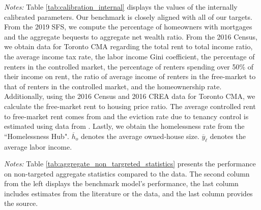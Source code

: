 \documentclass[parskip=full]{article}
\newenvironment{fignote2}[1]
{
\par
\medskip
\begin{minipage}{#1}
\footnotesize
}
{
\end{minipage}
}
\begin{document}
\begin{table}[H]
    \centering
    \caption{Internally assigned parameter values}
    \vspace{-0.5cm}
    \label{tab:calibration_internal}
    
    \vspace{-0.45cm}
    \begin{fignote2}{0.98\textwidth}
    \textit{Notes:} Table \ref{tab:calibration_internal} displays the values of the internally calibrated parameters. Our benchmark is closely aligned with all of our targets. From the 2019 SFS, we compute the percentage of homeowners with mortgages and the aggregate bequests to aggregate net wealth ratio.  From the 2016 Census, we obtain data for Toronto CMA regarding the total rent to total income ratio, the average income tax rate, the labor income Gini coefficient, the percentage of renters in the controlled market, the percentage of renters spending over 50\% of their income on rent, the ratio of average income of renters in the free-market to that of renters in the controlled market, and the homeownership rate. Additionally, using the 2016 Census and 2016 CREA data for Toronto CMA, we calculate the free-market rent to housing price ratio. The average controlled rent to free-market rent comes from \citet{zhang-gou} and the eviction rate due to tenancy control is estimated using data from \citet{LeonIveniuk2020}. Lastly, we obtain the homelessness rate from the ``Homelessness Hub". $\overline{h}_{o}$ denotes the average owned-house size. $\overline{y}_{\ell}$ denotes the average labor income. %
    \end{fignote2}
\end{table}

\begin{table}[H]
    \centering
    \caption{Aggregate non-targeted statistics}
    \vspace{-0.5cm}
    \label{tab:aggregate_non_targreted_statistics}  
    \vspace{-0.45cm}
    \begin{fignote2}{0.74\textwidth}
      \textit{Notes:} Table \ref{tab:aggregate_non_targreted_statistics} presents the performance on non-targeted aggregate statistics compared to the data. The second column from the left displays the benchmark model's performance, the last column includes estimates from the literature or the data, and the last column provides the source.
    \end{fignote2}
\end{table}
\end{document}
